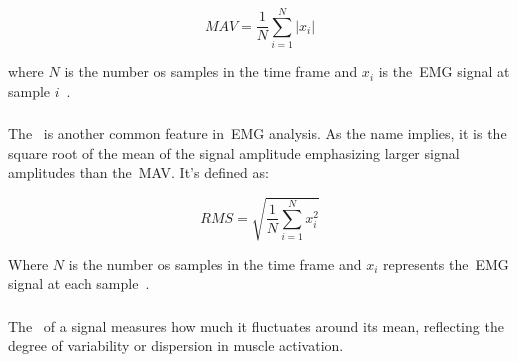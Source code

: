 \begin{equation}
  MAV = \frac{1}{N} \sum_{i = 1}^{N} \left\lvert x_i \right\rvert 
  \label{eq:mavEQ}
\end{equation}

where $N$ is the number os samples in the time frame and $x_i$ is the~\gls{EMG} signal at sample $i$~\cite{HandGestureRecognition, ComprehensiveStudyOnEMG, 
BiomedicalSignalProcessingAndControl, Review_IRBM_EMG, ReviewOfEMGSignalClassification, Hybrid, ComparativeStudyOfSEMGFeatureEvaluationMethods, EvaluationOfFeatureExtractionAndClassification}.



\subsubsection{} 
\label{sssec:root_mean_square}

The~ is another common feature in~\gls{EMG} analysis. As the name implies, it is the square root of the mean of the signal amplitude emphasizing larger signal amplitudes 
than the~\gls{MAV}. It's defined as:

\begin{equation}
  RMS = \sqrt{\frac{1}{N} \sum_{i = 1}^{N} x_i^2}
  \label{eq:rmsEQ}
\end{equation}

Where $N$ is the number os samples in the time frame and $x_i$ represents the~\gls{EMG} signal at each sample~\cite{HandGestureRecognition, BiomedicalSignalProcessingAndControl, 
MeasuringSurfaceElectromyographyWithTextileElectrodes, Review_IRBM_EMG, ReviewOfEMGSignalClassification, Hybrid, EvaluationOfFeatureExtractionAndClassification, ComparativeStudyOfSEMGFeatureEvaluationMethods, 
ResearchOnLowerLimbMotionRecognition}.

\subsubsection{} 
\label{sssec:variance}

The~ of a signal measures how much it fluctuates around its mean, reflecting the degree of variability or dispersion in muscle activation. 

